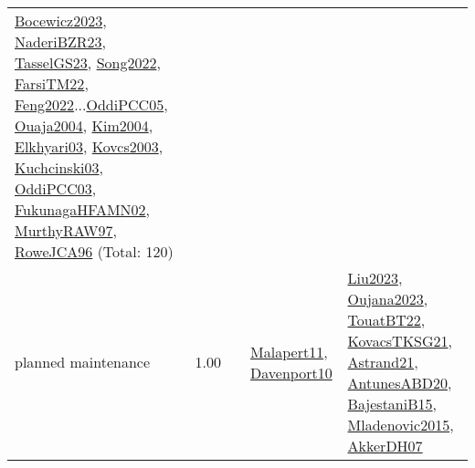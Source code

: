 {\begin{longtable}{p{3cm}r>{\raggedright\arraybackslash}p{6cm}>{\raggedright\arraybackslash}p{6cm}>{\raggedright\arraybackslash}p{8cm}}
\hyperref[detail:Bocewicz2023]{Bocewicz2023}, \hyperref[detail:NaderiBZR23]{NaderiBZR23}, \hyperref[detail:TasselGS23]{TasselGS23}, \hyperref[detail:Song2022]{Song2022}, \hyperref[detail:FarsiTM22]{FarsiTM22}, \hyperref[detail:Feng2022]{Feng2022}...\hyperref[detail:OddiPCC05]{OddiPCC05}, \hyperref[detail:Ouaja2004]{Ouaja2004}, \hyperref[detail:Kim2004]{Kim2004}, \hyperref[detail:Elkhyari03]{Elkhyari03}, \hyperref[detail:Kovcs2003]{Kovcs2003}, \hyperref[detail:Kuchcinski03]{Kuchcinski03}, \hyperref[detail:OddiPCC03]{OddiPCC03}, \hyperref[detail:FukunagaHFAMN02]{FukunagaHFAMN02}, \hyperref[detail:MurthyRAW97]{MurthyRAW97}, \hyperref[detail:RoweJCA96]{RoweJCA96} (Total: 120)\\
\index{planned maintenance}\index{Concepts!planned maintenance}planned maintenance &  1.00 &  & \hyperref[detail:Malapert11]{Malapert11}, \hyperref[detail:Davenport10]{Davenport10} & \hyperref[detail:Liu2023]{Liu2023}, \hyperref[detail:Oujana2023]{Oujana2023}, \hyperref[detail:TouatBT22]{TouatBT22}, \hyperref[detail:KovacsTKSG21]{KovacsTKSG21}, \hyperref[detail:Astrand21]{Astrand21}, \hyperref[detail:AntunesABD20]{AntunesABD20}, \hyperref[detail:BajestaniB15]{BajestaniB15}, \hyperref[detail:Mladenovic2015]{Mladenovic2015}, \hyperref[detail:AkkerDH07]{AkkerDH07}\\

\end{longtable}}

